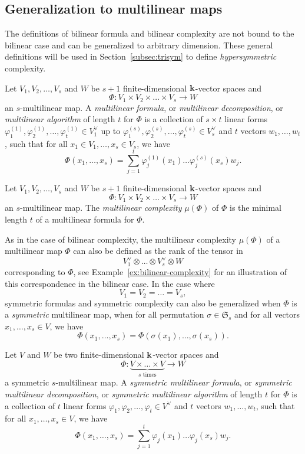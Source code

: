 \subsection{Generalization to multilinear maps}
The definitions of bilinear formula and bilinear complexity are not bound to the
bilinear case and can be generalized to arbitrary dimension. These general
definitions will be used in Section~\ref{subsec:trisym} to define
\emph{hypersymmetric} complexity.
\begin{defi}
Let $V_1, V_2, \dots, V_s$ and $W$ be $s+1$ finite-dimensional $\mathbf{k}$-vector
spaces and
\[
  \Phi:V_1\times V_2\times\dots\times V_s\to W
\]
an $s$-multilinear map. A \emph{multilinear formula}, or \emph{multilinear
decomposition}, or \emph{multilinear algorithm} of length $t$ for $\Phi$ is a
collection of $s\times t$ linear forms $\varphi_1^{(1)}, \varphi_2^{(1)}, \dots,
\varphi_t^{(1)}\in V_1^\vee$ up to $\varphi_1^{(s)}, \varphi_2^{(s)}, \dots,
\varphi_t^{(s)}\in V_s^{\vee}$ and $t$ vectors $w_1, \dots, w_t$, such that for all $x_1\in V_1, \dots, x_s\in
V_s$, we have
\[
  \Phi(x_1, \dots, x_s) =
  \sum_{j=1}^t\varphi_j^{(1)}(x_1)\dots\varphi_j^{(s)}(x_s)w_j.
\]
\end{defi}
\begin{defi}
Let $V_1, V_2, \dots, V_s$ and $W$ be $s+1$ finite-dimensional $\mathbf{k}$-vector
spaces and
\[
  \Phi:V_1\times V_2\times\dots\times V_s\to W
\]
an $s$-multilinear map. The \emph{multilinear complexity} $\mu(\Phi)$ of $\Phi$ is the
minimal length $t$ of a multilinear formula for $\Phi$.
\end{defi}
As in the case of bilinear complexity, the multilinear complexity $\mu(\Phi)$ of a
multilinear map $\Phi$ can also be defined as the rank of the tensor in 
\[
  V_1^\vee\otimes\dots\otimes V_s^\vee\otimes W
\]
corresponding to $\Phi$, see Example~\ref{ex:bilinear-complexity} for an
illustration of this correspondence in the bilinear case. In the case where
\[
  V_1 = V_2 = \dots = V_s,
\]
symmetric formulas and
symmetric complexity can also be generalized when $\Phi$ is a \emph{symmetric}
multilinear map, \ie when for all permutation $\sigma\in\mathfrak S_s$ and for
all vectors $x_1, \dots, x_s\in V$, we have
\[
  \Phi(x_1, \dots, x_s) = \Phi(\sigma(x_1), \dots, \sigma(x_s)).
\]
\begin{defi}
Let $V$ and $W$ be two finite-dimensional $\mathbf{k}$-vector
spaces and
\[
  \Phi:\underset{\textrm{$s$ times}}{\underbrace{V\times\dots\times V}}\to W
\]
a symmetric $s$-multilinear map. A \emph{symmetric multilinear formula}, or
\emph{symmetric multilinear
decomposition}, or \emph{symmetric multilinear algorithm} of length $t$ for $\Phi$ is a
collection of $t$ linear forms $\varphi_1, \varphi_2, \dots,
\varphi_t\in V^\vee$ and $t$ vectors $w_1, \dots, w_t$, such that for all $x_1, \dots, x_s\in
V$, we have
\[
  \Phi(x_1, \dots, x_s) =
  \sum_{j=1}^t\varphi_j(x_1)\dots\varphi_j(x_s)w_j.
\]
\end{defi}
